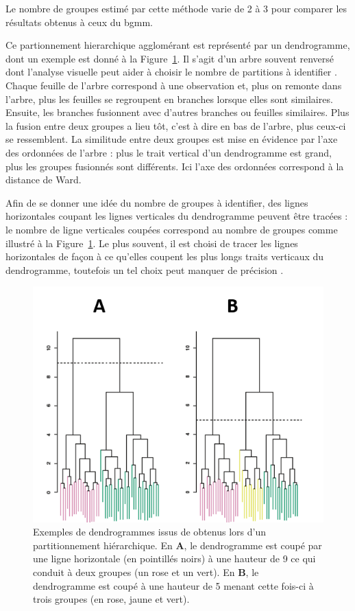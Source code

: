Le nombre de groupes estimé par cette méthode varie de 2 à 3 pour comparer les résultats obtenus à ceux du \gls{bgmm}. 

Ce partionnement hierarchique agglomérant est représenté par un dendrogramme, dont un exemple est donné à la 
Figure~\ref{Figure:tbr_dendrogram_example}. Il s'agit d'un arbre souvent renversé dont l'analyse visuelle 
peut aider à choisir le nombre de partitions à identifier \citep[Chapitre~10]{James2013}.
Chaque feuille de l'arbre correspond à une observation et, plus on remonte dans l'arbre, plus les feuilles se regroupent en branches lorsque elles 
sont similaires. Ensuite, les branches fusionnent avec d'autres branches ou feuilles similaires. Plus la fusion entre deux groupes a lieu tôt, c'est à dire en bas de
l'arbre, plus ceux-ci se ressemblent. La similitude entre deux groupes est mise en évidence par l'axe des ordonnées de l'arbre :
plus le trait vertical d'un dendrogramme est grand, plus les groupes fusionnés sont différents. Ici l'axe des ordonnées correspond à la distance de Ward.

Afin de se donner une idée du nombre de groupes à identifier, des lignes horizontales coupant les lignes verticales du dendrogramme peuvent être
tracées : le nombre de ligne verticales coupées correspond au nombre de groupes comme illustré à la Figure~\ref{Figure:tbr_dendrogram_example}.
Le plus souvent, il est choisi de tracer les lignes horizontales de façon à ce qu'elles coupent les plus longs traits verticaux du dendrogramme, 
toutefois un tel choix peut manquer de précision \citep[Chapitre~10]{James2013}.

\begin{figure}[h!]
  \centering
	\includegraphics[width=0.7\linewidth]{figures/chapter-4/tbr-dendrogram-example} 
  \caption[Exemples de dendrogrammes obtenus lors d'un partitionnement hiérarchique.]{Exemples de dendrogrammes 
	issus de \citet[Chapitre~10]{James2013} obtenus lors d'un partitionnement hiérarchique. En \textbf{A}, le dendrogramme est coupé
	par une ligne horizontale (en pointillés noirs) à une hauteur de 9 ce qui conduit à deux groupes (un rose et un vert). En \textbf{B}, le dendrogramme
	est coupé à une hauteur de 5 menant cette fois-ci à trois groupes (en rose, jaune et vert).} 
	\label{Figure:tbr_dendrogram_example} 
\end{figure}

